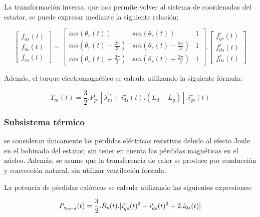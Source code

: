 \documentclass{article}
\begin{document}
    La transformación inversa, que nos permite volver al sistema de coordenadas del estator, se puede 
    expresar mediante la siguiente relación:
    
    \begin{equation}
        \begin{bmatrix}
            f_{as}(t)\\
            f_{bs}(t)\\
            f_{cs}(t)
        \end{bmatrix}
        =
        \begin{bmatrix}
            cos(\theta_r(t)) & sin(\theta_r(t)) & 1\\
            cos(\theta_r(t) - \frac{2\pi}{3}) & sin(\theta_r(t) - \frac{2\pi}{3}) & 1\\
            cos(\theta_r(t) + \frac{2\pi}{3}) & sin(\theta_r(t) + \frac{2\pi}{3}) & 1
        \end{bmatrix}.
        \begin{bmatrix}
            f_{qs}^r(t)\\
            f_{ds}^r(t)\\
            f_{0s}^r(t)
        \end{bmatrix}
    \end{equation}

    Además, el torque electromagnético se calcula utilizando la siguiente fórmula:

    \begin{equation}\label{eq.torque_electromagnetico}
        T_{m}(t) = \frac{3}{2}.P_{p}.[\lambda_{m}^{\prime r}+i_{ds}^r(t).(L_{d}-L_{q})].i_{qs}^r(t)
    \end{equation}
        

    \subsubsection{Subsistema térmico} 
    
    se consideran únicamente las pérdidas eléctricas resistivas debido al efecto Joule en el bobinado del 
    estator, sin tener en cuenta las pérdidas magnéticas en el núcleo. Además, se asume que la 
    transferencia de calor se produce por conducción y convección natural, sin utilizar ventilación forzada.

    La potencia de pérdidas calóricas se calcula utilizando las siguientes expresiones:

    \begin{equation}
        P_{s_{perd}}(t) =  \frac{3}{2}.R_{s}(t).[i_{qs}^r(t)^2+i_{ds}^r(t)^2+2.i_{0s}(t)]\\
    \end{equation}
    
\end{document}
